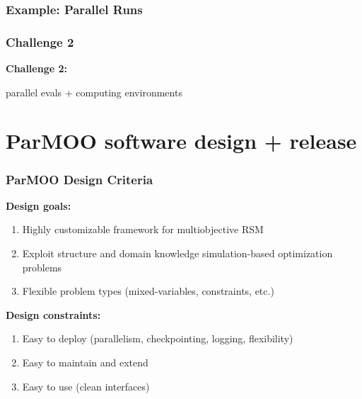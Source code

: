 \documentclass[aspectratio=169]{beamer}
\begin{document}
\begin{frame}\frametitle{Example: Parallel Runs}

\end{frame}

\begin{frame}\frametitle{Challenge 2}
\vfill
\begin{center}
{\Huge \bf
Challenge 2:\\

\bigskip

parallel evals + computing environments
}
\end{center}
\vfill
\end{frame}

\section{ParMOO software design + release}

\begin{frame}\frametitle{ParMOO Design Criteria}

\textbf{Design goals:}
\begin{enumerate}
\item Highly customizable framework for multiobjective RSM
\item Exploit structure and domain knowledge simulation-based optimization
problems
\item Flexible problem types (mixed-variables, constraints, etc.)
\end{enumerate}

\medskip
\pause

\textbf{Design constraints:}
\begin{enumerate}
\item Easy to deploy (parallelism, checkpointing, logging, flexibility)
\item Easy to maintain and extend
\item Easy to use (clean interfaces)
\end{enumerate}
\end{frame}
\end{document}
